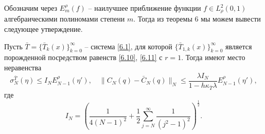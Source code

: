 Обозначим через $E^\rho_ m(f)$ -- наилучшее приближение функции $f\in L^2_\rho(0,1)$ алгебраическими полиномами степени $m$. Тогда из теоремы 6 мы можем вывести следующее утверждение.
\begin{corollary}
  Пусть $\bar T=\{\bar T_k(x)\}_{k=0}^\infty$ -- система  \eqref{6.1}, для которой  $\{\bar T_{1,k}(x)\}_{k=0}^\infty$  является порожденной посредством равенств \eqref{6.10}, \eqref{6.11} с $r=1$. Тогда   имеют место неравенства
$$
\sigma^{\bar T}_N(\eta)\le I_NE^\rho_ {N-1}(\eta'),\quad\|C_N(q)-\bar C_N(q)\|_N\le \frac{\lambda I_N}{1-h\kappa_{\bar T}\lambda}E^\rho_ {N-1}(\eta'),
$$
где
$$
I_N=\left(\frac{1}{4(N-1)^2}+\frac12\sum_{j=N}^{\infty}\frac{1}{(j^2-1)^2}\right)^\frac12.
 $$
\end{corollary}
%


















